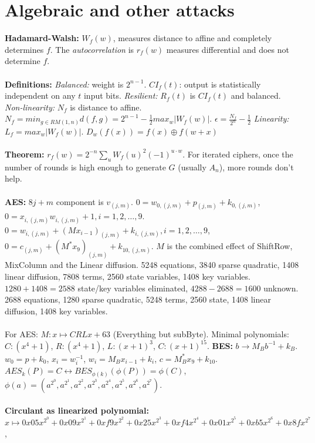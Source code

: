 \section {Algebraic and other attacks}
{\bf Hadamard-Walsh:} $W_f(w)$, measures distance to affine and
completely determines $f$.
The
\emph{autocorrelation} is $r_f(w)$ measures differential and
does not determine $f$.
\\
\\
{\bf Definitions:}
\emph{Balanced:} weight is $2^{n-1}$.
$CI_f(t)$: output is statistically independent on any $t$ input bits.
\emph{Resilient:} $R_f(t)$ is $CI_f(t)$ and balanced.
\emph{Non-linearity:} $N_f$ is distance to affine.  
$N_f= min_{g \in RM(1,n)} d(f,g)= 2^{n-1} - {\frac 1 2} max_{w} |W_f(w)|$.
$\epsilon= {\frac {N_f} {2^n}} - {\frac 1 2}$
\emph{Linearity:} $L_f= max_w |W_f(w)|$.
$D_w(f(x))= f(x) \oplus f(w+x)$\\
\\
{\bf Theorem:} $r_f(w)= 2^{-n} \sum_u W_f(u)^2 (-1)^{u \cdot w}$.
For iterated ciphers, once the number of rounds is high enough to generate
$G$ (usually $A_n$), more rounds don't help.
\\
\\
{\bf AES:} $8j+m$ component is $v_{(j,m)}$.
$0=w_{0,(j,m)}+p_{(j,m)}+k_{0,(j,m)}$,
$0=x_{i,(j,m)} w_{i,(j,m)}+1, i=1,2,\ldots, 9$.
$0=w_{i,(j,m)}+(M x_{i-1})_{(j,m)}+k_{i,(j,m)}, i= 1,2, \ldots, 9$,
$0=c_{(j,m)}+(M^* x_{9})_{(j,m)}+k_{10,(j,m)}$.
$M$ is the combined effect of ShiftRow, MixColumn and the Linear diffusion.
5248 equations, 3840 sparse quadratic, 1408 linear diffusion, 7808 terms, 2560 state
variables, 1408 key variables. $1280+1408=2588$ state/key variables eliminated, 
$4288-2688=1600$ unknown.
2688 equations, 1280 sparse quadratic, 5248 terms, 2560 state, 1408 linear diffusion,
1408 key variables.
\\
\\
For AES: $M: x \mapsto CRLx+63$ (Everything but subByte).  Minimal polynomials: 
$C: (x^4+1)$,
$R: (x^4+1)$,
$L: (x+1)^3$,
$C: (x+1)^{15}$.  
{\bf BES:} $b \rightarrow M_B b^{-1} + k_B$.
$w_0=p+k_0$,
$x_i=w_i^{-1}$,
$w_i=M_B x_{i-1} + k_i$,
$c=M_B^* x_{9} + k_{10}$.
$AES_{k}(P)=C \leftrightarrow BES_{ \phi(k) } ( \phi (P) )=\phi(C)$, 
$\phi(a)= ( a^{2^0}, a^{2^1}, a^{2^2}, a^{2^3}, a^{2^4}, a^{2^5}, a^{2^6}, a^{2^7})$.
\\
\\
{\bf Circulant as linearized polynomial:} $x \mapsto 0x05x^{2^0}+ 0x09x^{2^1}+ 0xf9x^{2^2}+ 
0x25x^{2^3}+ 0xf4x^{2^4}+ 0x01x^{2^5}+ 0xb5x^{2^6}+ 0x8fx^{2^7}$, 
